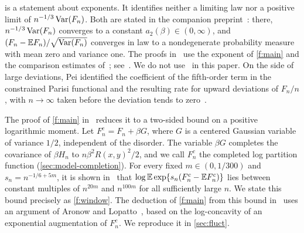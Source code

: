  is a statement about exponents. It identifies neither a
limiting law nor a positive limit of $n^{-1/3}\operatorname{Var}(F_n)$. Both are stated in
the companion preprint~\cite[Theorems~1.1 and~1.2]{oai-limiting-law}: there,
$n^{-1/3}\operatorname{Var}(F_n)$ converges to a constant $a_2(\beta)\in(0,\infty)$, and
$(F_n-\mathbb E F_n)/\sqrt{\operatorname{Var}(F_n)}$ converges in law to a nondegenerate
probability measure with mean zero and variance one. The proofs
in~\cite{oai-limiting-law} use the exponent of \cref{f:main} and the
comparison estimates of~\cite{oai-fluctuations};
see~\cite[Appendix~A]{oai-limiting-law}. We do not use~\cite{oai-limiting-law} in
this paper. On the side of large deviations, Pei identified the coefficient
of the fifth-order term in the constrained Parisi functional and the
resulting rate for upward deviations of $F_n/n$, with $n\to\infty$ taken
before the deviation tends to zero~\cite[Theorem~1]{pei-fifth-order-2026}.

The proof of \cref{f:main} in~\cite{oai-fluctuations} reduces it to a
two-sided bound on a positive logarithmic moment. Let $F_n^c=F_n+\beta G$,
where $G$ is a centered Gaussian variable of variance $1/2$, independent of
the disorder. The variable $\beta G$ completes the covariance of $\beta H_n$ to
$n\beta^2R(x,y)^2/2$, and we call $F_n^c$ the completed log partition
function (\cref{sec:model-completion}). For every fixed $m\in(0,1/300)$ and
$s_n=n^{-1/6+5m}$, it is shown in~\cite[Proposition~7.5]{oai-fluctuations}
that $\log\mathbb E\exp\{s_n(F_n^c-\mathbb E F_n^c)\}$ lies between constant multiples of
$n^{20m}$ and $n^{100m}$ for all sufficiently large $n$. We state this bound
precisely as \cref{f:window}. The deduction of \cref{f:main} from this bound
in~\cite[Lemmas~7.6 and~7.7]{oai-fluctuations} uses an argument of Aronow
and Lopatto~\cite[Proposition~5.1]{quantitative-parisi}, based on the
log-concavity of an exponential augmentation of $F_n^c$. We reproduce it in
\cref{sec:fluct}.

